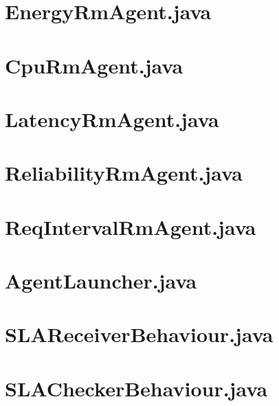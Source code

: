 \section{EnergyRmAgent.java}


\section{CpuRmAgent.java}


\section{LatencyRmAgent.java}


\section{ReliabilityRmAgent.java}


\section{ReqIntervalRmAgent.java}


\section{AgentLauncher.java}


\section{SLAReceiverBehaviour.java}


\section{SLACheckerBehaviour.java}


